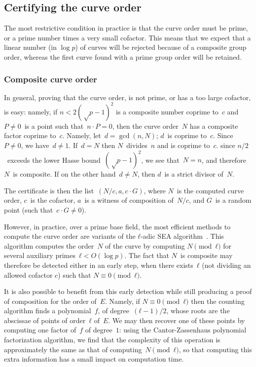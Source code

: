 \documentclass[twocolumn,letterpaper,10pt]{article}
\begin{document}
\subsection{Certifying the curve order}

The most restrictive condition in practice is that
the curve order must be prime, or a prime number
times a very small cofactor.
This means that we expect that a linear number (in $\log p$)
of curves will be rejected because of a composite group order,
whereas the first curve found with a prime group order
will be retained.

\subsubsection{Composite curve order}

In general, proving that the curve order,
is not prime, or has a too large cofactor, is easy:
namely, if $n < 2 (√p-1)^2$ is a composite number coprime to~$c$
and $P ≠ 0$~is a point such that~$n · P = 0$,
then the curve order~$N$ has a composite factor coprime to~$c$.
Namely, let~$d = \gcd (n, N)$; $d$~is coprime to~$c$.
Since~$P≠0$, we have~$d≠1$.
If~$d = N$ then $N$~divides~$n$ and is coprime to~$c$.
since $n/2$~exceeds the lower Hasse bound~$(√p-1)^2$,
we see that~$N = n$, and therefore $N$~is composite.
If on the other hand~$d ≠ N$, then $d$~is a strict divisor of~$N$.

The certificate is then the list~$(N/c, a, c · G)$,
where $N$~is the computed curve order, $c$~is the cofactor,
$a$~is a witness of composition of~$N/c$,
and $G$~is a random point (such that~$c · G ≠ 0$).

\smallskip

However, in practice, over a prime base field,
the most efficient methods to compute the curve order are
variants of the $ℓ$-adic SEA algorithm~\cite{mathcomp1985schoof,
jtnb1995schoof,smf2008cl}.
This algorithm computes the order~$N$ of the curve
by computing $N \pmod{ℓ}$ for several
auxiliary primes~$ℓ < O(\log p)$.
The fact that $N$~is composite may therefore be detected
either in an early step,
when there exists~$ℓ$ (not dividing an allowed cofactor $c$)
such that $N ≡ 0 \pmod{ℓ}$.

It is also possible to benefit from this early detection
while still producing a proof of composition for the order of~$E$.
Namely, if $N ≡ 0 \pmod{ℓ}$ then
the counting algorithm finds a polynomial~$f$, of degree~$(ℓ-1)/2$,
whose roots are the abscissae of points of order~$ℓ$ of~$E$.
We may then recover one of these points by
computing one factor of~$f$ of degree~$1$:
using the Cantor-Zassenhaus polynomial factorization algorithm,
we find that the complexity of this operation
is approximately the same as that of computing~$N \pmod{ℓ}$,
so that computing this extra information
has a small impact on computation time.
\end{document}
